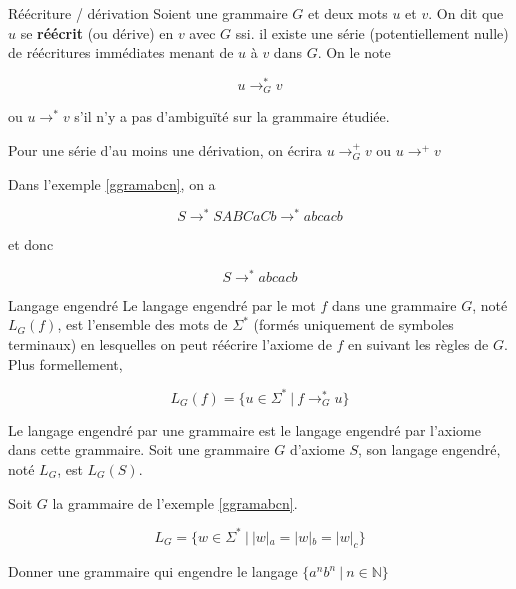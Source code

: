 \begin{definition}{Réécriture / dérivation}{}
Soient une grammaire $G$ et deux mots $u$ et $v$. On dit que $u$ se \textbf{réécrit} (ou dérive) en $v$ avec $G$ ssi. il existe une série (potentiellement nulle) de réécritures immédiates menant de $u$ à $v$ dans $G$. On le note 

\[
u \rightarrow_G^* v
\]

ou $u \rightarrow^* v$ s'il n'y a pas d'ambiguïté sur la grammaire étudiée.

Pour une série d'au moins une dérivation, on écrira $u \rightarrow_G^+ v$ ou $u \rightarrow^+ v$
\end{definition}
 
\begin{example}
Dans l'exemple \ref{ggramabcn}, on a 

\[
S \rightarrow^* SABCaCb \rightarrow^* abcacb
\]

et donc 

\[
S \rightarrow^* abcacb
\]
\end{example}
 

\begin{definition}{Langage engendré}{}
Le langage engendré par le mot $f$ dans une grammaire $G$, noté $L_G(f)$, est l'ensemble des mots de $\Sigma^*$ (formés uniquement de symboles terminaux) en lesquelles on peut réécrire l'axiome de $f$ en suivant les règles de $G$. Plus formellement,

\[
L_G(f) = \{u \in \Sigma^* ~|~f \rightarrow_G^* u\}
\]

Le langage engendré par une grammaire est le langage engendré par l'axiome dans cette grammaire. Soit une grammaire $G$ d'axiome $S$, son langage engendré, noté $L_G$, est $L_G(S)$.
\end{definition}

\begin{example}
Soit $G$ la grammaire de l'exemple \ref{ggramabcn}. 

\[
L_G = \{w \in \Sigma^* ~|~|w|_a = |w|_b = |w|_c \}
\]
\end{example}


\begin{exercice}
Donner une grammaire qui engendre le langage $\{a^nb^n ~|~ n \in \mathbb{N}\}$
\end{exercice}

